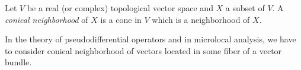 \documentclass[12pt]{article}
\begin{document}
Let $V$ be a real (or complex) topological vector space and $X$ a subset of $V$.
A {\em conical neighborhood} of $X$ is a cone in $V$ which is a neighborhood of $X$.

In the theory of pseudodifferential operators and in microlocal analysis, we have to consider conical neighborhood of vectors located in some fiber of a vector bundle.
\end{document}
